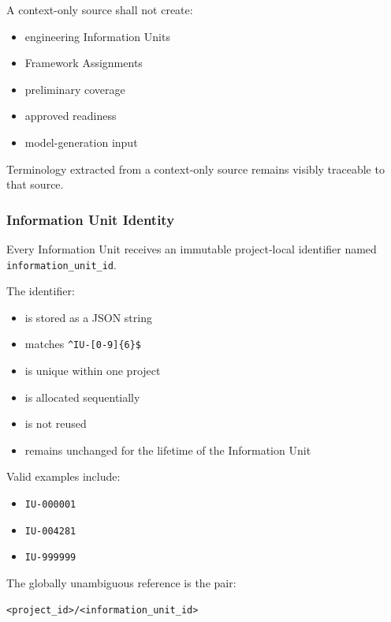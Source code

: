A context-only source shall not create:

\begin{itemize}
\tightlist
\item
  engineering Information Units
\item
  Framework Assignments
\item
  preliminary coverage
\item
  approved readiness
\item
  model-generation input
\end{itemize}

Terminology extracted from a context-only source remains visibly traceable to that source.

\hypertarget{information-unit-identity}{%
\subsubsection{Information Unit Identity}\label{information-unit-identity}}

Every Information Unit receives an immutable project-local identifier named \texttt{information\_unit\_id}.

The identifier:

\begin{itemize}
\tightlist
\item
  is stored as a JSON string
\item
  matches \texttt{\^{}IU-{[}0-9{]}\{6\}\$}
\item
  is unique within one project
\item
  is allocated sequentially
\item
  is not reused
\item
  remains unchanged for the lifetime of the Information Unit
\end{itemize}

Valid examples include:

\begin{itemize}
\tightlist
\item
  \texttt{IU-000001}
\item
  \texttt{IU-004281}
\item
  \texttt{IU-999999}
\end{itemize}

The globally unambiguous reference is the pair:

\begin{verbatim}
<project_id>/<information_unit_id>
\end{verbatim}

